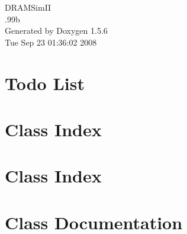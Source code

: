 \documentclass[a4paper]{book}
\begin{document}
\begin{titlepage}
\vspace*{7cm}
\begin{center}
{\Large DRAMSimII \\[1ex]\large .99b }\\
\vspace*{1cm}
{\large Generated by Doxygen 1.5.6}\\
\vspace*{0.5cm}
{\small Tue Sep 23 01:36:02 2008}\\
\end{center}
\end{titlepage}
\clearemptydoublepage
{}
\tableofcontents
\clearemptydoublepage
{}
\chapter{Todo List}
\label{todo}

\chapter{Class Index}

\chapter{Class Index}

\chapter{Class Documentation}























\printindex
\end{document}
